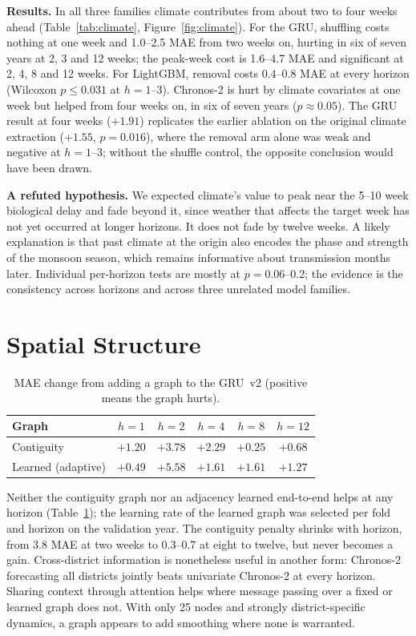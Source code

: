 \textbf{Results.} In all three families climate contributes from about two to four weeks ahead (Table~\ref{tab:climate}, Figure~\ref{fig:climate}). For the GRU, shuffling costs nothing at one week and 1.0--2.5 MAE from two weeks on, hurting in six of seven years at 2, 3 and 12 weeks; the peak-week cost is 1.6--4.7 MAE and significant at 2, 4, 8 and 12 weeks. For LightGBM, removal costs 0.4--0.8 MAE at every horizon (Wilcoxon $p\le0.031$ at $h=1$--3). Chronos-2 is hurt by climate covariates at one week but helped from four weeks on, in six of seven years ($p\approx0.05$). The GRU result at four weeks ($+1.91$) replicates the earlier ablation on the original climate extraction ($+1.55$, $p=0.016$), where the removal arm alone was weak and negative at $h=1$--3; without the shuffle control, the opposite conclusion would have been drawn.

\textbf{A refuted hypothesis.} We expected climate's value to peak near the 5--10 week biological delay and fade beyond it, since weather that affects the target week has not yet occurred at longer horizons. It does not fade by twelve weeks. A likely explanation is that past climate at the origin also encodes the phase and strength of the monsoon season, which remains informative about transmission months later. Individual per-horizon tests are mostly at $p=0.06$--0.2; the evidence is the consistency across horizons and across three unrelated model families.

\section{Spatial Structure}
\label{sec:spatial}

\begin{table}[t]
\centering
\caption{MAE change from adding a graph to the GRU~v2 (positive means the graph hurts).}
\label{tab:graphs}
\begin{tabular}{lccccc}
\toprule
\textbf{Graph} & $h=1$ & $h=2$ & $h=4$ & $h=8$ & $h=12$ \\
\midrule
Contiguity & $+1.20$ & $+3.78$ & $+2.29$ & $+0.25$ & $+0.68$ \\
Learned (adaptive) & $+0.49$ & $+5.58$ & $+1.61$ & $+1.61$ & $+1.27$ \\
\bottomrule
\end{tabular}
\end{table}

Neither the contiguity graph nor an adjacency learned end-to-end helps at any horizon (Table~\ref{tab:graphs}); the learning rate of the learned graph was selected per fold and horizon on the validation year. The contiguity penalty shrinks with horizon, from 3.8 MAE at two weeks to 0.3--0.7 at eight to twelve, but never becomes a gain. Cross-district information is nonetheless useful in another form: Chronos-2 forecasting all districts jointly beats univariate Chronos-2 at every horizon. Sharing context through attention helps where message passing over a fixed or learned graph does not. With only 25 nodes and strongly district-specific dynamics, a graph appears to add smoothing where none is warranted.

